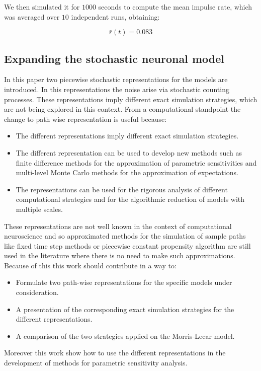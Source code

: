		We then simulated it for $1000$ seconds to compute the mean impulse rate, which was averaged over $10$ independent runs, obtaining:

		$$\bar{r}(t) = 0.083$$


	\subsection{Expanding the stochastic neuronal model}
	In this paper two piecewise stochastic representations for the models are introduced.
	In this representations the noise arise via stochastic counting processes.
	These representations imply different exact simulation strategies, which are not being explored in this context.
	From a computational standpoint the change to path wise representation is useful because:

	\begin{itemize}
		\item The different representations imply different exact simulation strategies.
		\item The different representation can be used to develop new methods such as finite difference methods for the approximation of parametric sensitivities and multi-level Monte Carlo methods for the approximation of expectations.
		\item The representations can be used for the rigorous analysis of different computational strategies and for the algorithmic reduction of models with multiple scales.
	\end{itemize}

	These representations are not well known in the context of computational neuroscience and so approximated methods for the simulation of sample paths like fixed time step methods or piecewise constant propensity algorithm are still used in the literature where there is no need to make such approximations.
	Because of this this work should contribute in a way to:

	\begin{itemize}
		\item Formulate two path-wise representations for the specific models under consideration.
		\item A presentation of the corresponding exact simulation strategies for the different representations.
		\item A comparison of the two strategies applied on the Morris-Lecar model.
	\end{itemize}

	Moreover this work show how to use the different representations in the development of methods for parametric sensitivity analysis.
